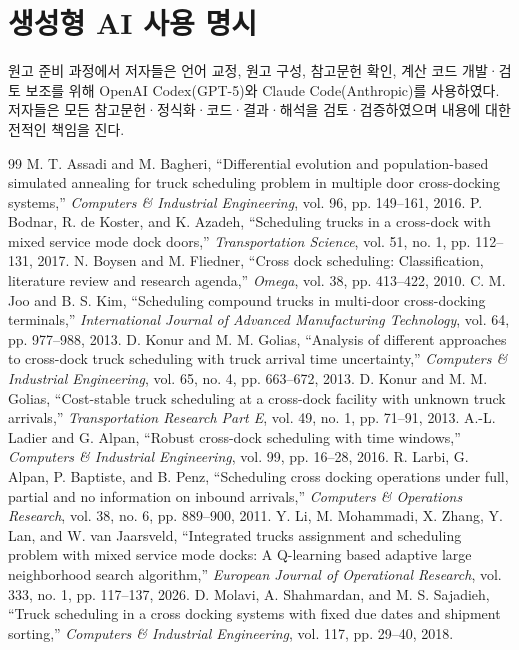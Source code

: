 \documentclass[10pt,a4paper]{article}
\begin{document}
\section*{생성형 AI 사용 명시}
원고 준비 과정에서 저자들은 언어 교정, 원고 구성, 참고문헌 확인, 계산 코드
개발·검토 보조를 위해 OpenAI Codex(GPT-5)와 Claude Code(Anthropic)를 사용하였다.
저자들은 모든 참고문헌·정식화·코드·결과·해석을 검토·검증하였으며 내용에 대한
전적인 책임을 진다.

\begin{thebibliography}{99}\small
{} M. T. Assadi and M. Bagheri, ``Differential evolution and population-based simulated annealing for truck scheduling problem in multiple door cross-docking systems,'' \emph{Computers \& Industrial Engineering}, vol. 96, pp. 149--161, 2016.
 P. Bodnar, R. de Koster, and K. Azadeh, ``Scheduling trucks in a cross-dock with mixed service mode dock doors,'' \emph{Transportation Science}, vol. 51, no. 1, pp. 112--131, 2017.
 N. Boysen and M. Fliedner, ``Cross dock scheduling: Classification, literature review and research agenda,'' \emph{Omega}, vol. 38, pp. 413--422, 2010.
 C. M. Joo and B. S. Kim, ``Scheduling compound trucks in multi-door cross-docking terminals,'' \emph{International Journal of Advanced Manufacturing Technology}, vol. 64, pp. 977--988, 2013.
 D. Konur and M. M. Golias, ``Analysis of different approaches to cross-dock truck scheduling with truck arrival time uncertainty,'' \emph{Computers \& Industrial Engineering}, vol. 65, no. 4, pp. 663--672, 2013.
 D. Konur and M. M. Golias, ``Cost-stable truck scheduling at a cross-dock facility with unknown truck arrivals,'' \emph{Transportation Research Part E}, vol. 49, no. 1, pp. 71--91, 2013.
 A.-L. Ladier and G. Alpan, ``Robust cross-dock scheduling with time windows,'' \emph{Computers \& Industrial Engineering}, vol. 99, pp. 16--28, 2016.
 R. Larbi, G. Alpan, P. Baptiste, and B. Penz, ``Scheduling cross docking operations under full, partial and no information on inbound arrivals,'' \emph{Computers \& Operations Research}, vol. 38, no. 6, pp. 889--900, 2011.
 Y. Li, M. Mohammadi, X. Zhang, Y. Lan, and W. van Jaarsveld, ``Integrated trucks assignment and scheduling problem with mixed service mode docks: A Q-learning based adaptive large neighborhood search algorithm,'' \emph{European Journal of Operational Research}, vol. 333, no. 1, pp. 117--137, 2026.
 D. Molavi, A. Shahmardan, and M. S. Sajadieh, ``Truck scheduling in a cross docking systems with fixed due dates and shipment sorting,'' \emph{Computers \& Industrial Engineering}, vol. 117, pp. 29--40, 2018.

\end{thebibliography}
\end{document}
